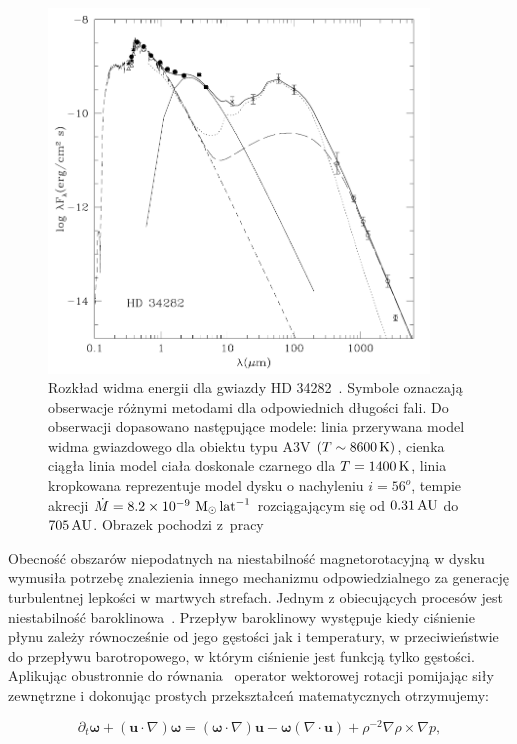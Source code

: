 \begin{figure}
   \includegraphics[width=0.9\textwidth]{figures/chap1_sed.png}
   \caption{Rozkład widma energii dla gwiazdy HD 34282~\cite{MME04}. Symbole oznaczają
      obserwacje różnymi metodami dla odpowiednich długości fali. Do obserwacji
      dopasowano następujące modele: linia przerywana model widma gwiazdowego
      dla obiektu typu A3V $(T\sim 8600\hbox{$\thinspace\textrm{K}$})$, cienka ciągła
      linia model ciała doskonale czarnego dla $T=1400\hbox{$\thinspace\textrm{K}$}$,
      linia kropkowana reprezentuje model dysku o nachyleniu $i=56^o$, tempie
      akrecji $\dot{M} = 8.2\times10^{-9}\thinspace\hbox{$\mathrm{\thinspace M_{\odot}}$}\hbox{$\thinspace\textrm{lat}$}^{-1}$
      rozciągającym się od $0.31\hbox{$\thinspace\textrm{AU}$}$ do $705\hbox{$\thinspace\textrm{AU}$}$.
   Obrazek pochodzi z~pracy~\cite{MME04}}
   \label{fig:sed}
\end{figure}

Obecność obszarów niepodatnych na niestabilność magnetorotacyjną w dysku
wymusiła potrzebę znalezienia innego mechanizmu odpowiedzialnego za generację
turbulentnej lepkości w martwych strefach. Jednym z obiecujących procesów jest
niestabilność baroklinowa~\cite{KB03, Kl04}. Przepływ baroklinowy występuje
kiedy ciśnienie płynu zależy równocześnie od jego gęstości jak i temperatury, w
przeciwieństwie do przepływu barotropowego, w którym ciśnienie jest funkcją
tylko gęstości. Aplikując obustronnie do równania~ operator
wektorowej rotacji pomijając siły zewnętrzne i dokonując prostych przekształceń
matematycznych otrzymujemy:

\begin{equation}
   \partial_t \mathbf{\omega} + (\mathbf{u}\cdot\nabla)\mathbf{\omega} =
   (\mathbf{\omega}\cdot\nabla)\mathbf{u} -
   \mathbf{\omega}\left(\nabla\cdot\mathbf{u}\right) + \rho^{-2}\nabla \rho \times
      \nabla p,
   \label{eq:vort}
\end{equation}

